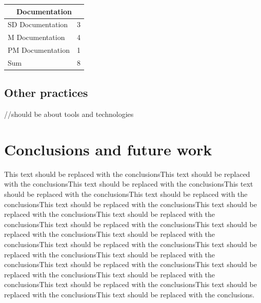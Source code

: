 \documentclass[final,5p,times,twocolumn]{elsarticle}
\begin{document}
\begin{center}
\begin{tabular}{|l|l|}
\hline
\multicolumn{2}{|c|}{\textbf{Documentation}} \\
\hline
SD Documentation & 3 \\
M Documentation & 4 \\
PM Documentation & 1 \\
\hline
Sum & 8\\
\hline
\end{tabular}
\end{center}


\label{sub:analysis-managerial}


\subsection{Other practices}
\label{sub:analysis-other}
//should be about tools and technologies

\section{Conclusions and future work} %
 \label{sect:concl}

 This text should be replaced with the conclusionsThis text should be replaced with the conclusionsThis text should be replaced with the conclusionsThis text should be replaced with the conclusionsThis text should be replaced with the conclusionsThis text should be replaced with the conclusionsThis text should be replaced with the conclusionsThis text should be replaced with the conclusionsThis text should be replaced with the conclusionsThis text should be replaced with the conclusionsThis text should be replaced with the conclusionsThis text should be replaced with the conclusionsThis text should be replaced with the conclusionsThis text should be replaced with the conclusionsThis text should be replaced with the conclusionsThis text should be replaced with the conclusionsThis text should be replaced with the conclusionsThis text should be replaced with the conclusionsThis text should be replaced with the conclusionsThis text should be replaced with the conclusions. 
\end{document}
